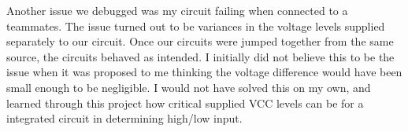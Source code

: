 Another issue we debugged was my circuit failing when connected to a teammates. The issue turned out to be variances in the voltage levels supplied separately to our circuit. Once our circuits were jumped together from the same source, the circuits behaved as intended. I initially did not believe this to be the issue when it was proposed to me thinking the voltage difference would have been small enough to be negligible. I would not have solved this on my own, and learned through this project how critical supplied VCC levels can be for a integrated circuit in determining high/low input.
